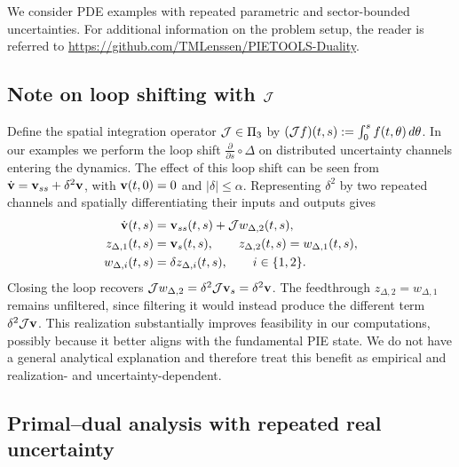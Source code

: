
We consider PDE examples with repeated parametric and sector-bounded
uncertainties. For additional information on the problem setup, the reader is
referred to \url{https://github.com/TMLenssen/PIETOOLS-Duality}.

\subsection{Note on loop shifting with $\mathcal{J}$}

Define the spatial integration operator $\mathcal{J}\in\Pi_3$ by
$(\mathcal{J}f)(t,s):=\int_0^s f(t,\theta)\,d\theta$.
In our examples we perform the loop shift $\frac{\partial}{\partial s}
\circ\Delta$ on distributed uncertainty channels entering the dynamics.
The effect of this loop shift can be seen from
$\dot{\mathbf{v}}=\mathbf{v}_{ss}+\delta^2\mathbf{v}$, with $\mathbf{v}(t,0)=0$ and
$|\delta|\leq\alpha$. Representing $\delta^2$ by two repeated channels and
spatially differentiating their inputs and outputs gives
\begin{align*}
 \dot{\mathbf{v}}(t,s)&=\mathbf{v}_{ss}(t,s)+\mathcal{J}w_{\Delta,2}(t,s),\\
 z_{\Delta,1}(t,s)&=\mathbf{v}_s(t,s),\qquad z_{\Delta,2}(t,s)=w_{\Delta,1}(t,s),\\
 w_{\Delta,i}(t,s)&=\delta z_{\Delta,i}(t,s),\qquad i\in\{1,2\}.
\end{align*}
Closing the loop recovers
$\mathcal{J}w_{\Delta,2}=\delta^2\mathcal{J}\mathbf{v}_s=\delta^2\mathbf{v}$. The
feedthrough $z_{\Delta,2}=w_{\Delta,1}$ remains unfiltered, since filtering
it would instead produce the different term $\delta^2\mathcal{J}\mathbf{v}$. This
realization substantially improves feasibility in our computations,
possibly because it better aligns with the fundamental PIE state. We do not
have a general analytical explanation and therefore treat this benefit as
empirical and realization- and uncertainty-dependent.

\subsection{Primal--dual analysis with repeated real uncertainty}
\label{ex:coupled-heat}


